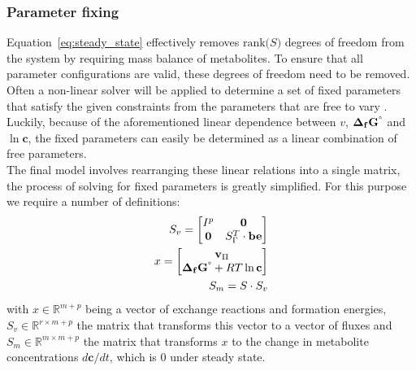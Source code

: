\documentclass[10pt,letterpaper]{article}
\newcommand{\sdgf}{\Delta_fG^{\degree}}
\newcommand{\bsdgf}{\mathbf{\sdgf}}
\newcommand{\bc}{\mathbf{c}}
\newcommand{\bv}{\mathbf{v}}
\newcommand{\bbe}{\mathbf{be}}
\begin{document}
\subsubsection{Parameter fixing}
Equation~\ref{eq:steady_state} effectively removes $\text{rank(}S\text{)}$ degrees of freedom from the system by requiring mass balance of metabolites.
To ensure that all parameter configurations are valid, these degrees of freedom need to be removed.
Often a non-linear solver will be applied to determine a set of fixed parameters that satisfy the given constraints from the parameters that are free to vary \cite{stan_docs_solver}.
Luckily, because of the aforementioned linear dependence between $v$, $\bsdgf$ and $\ln{\bc}$, the fixed parameters can easily be determined as a linear combination of free parameters.
\\
The final model involves rearranging these linear relations into a single matrix, the process of solving for fixed parameters is greatly simplified.
For this purpose we require a number of definitions:
\begin{align}
    S_v = \begin{bmatrix}
             I^p & \mathbf{0} \\
             \mathbf{0} & S_{\Gamma}^T \cdot \bbe\\
          \end{bmatrix} \\
    x = \begin{bmatrix}
            \bv_{\Pi} \\
            \bsdgf + RT\ln{\bc}\\
        \end{bmatrix} \\
    S_m = S \cdot S_v\\
\end{align}
with $x \in \mathbb{R}^{m+p}$ being a vector of exchange reactions and formation energies, $S_v \in \mathbb{R}^{r \times m+p}$
 the matrix that transforms this vector to a vector of fluxes and $S_m \in \mathbb{R}^{m \times m+p}$ the matrix that
 transforms $x$ to the change in metabolite concentrations $d\bc/dt$, which is 0 under steady state.
\end{document}

